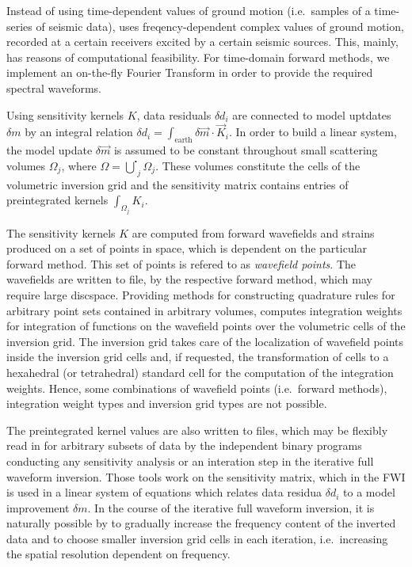 Instead of using time-dependent values of ground motion (i.e.\ samples of a time-series of seismic data), 
\ASKI{} uses freqency-dependent complex values of ground motion, recorded at a certain receivers excited 
by a certain seismic sources. This, mainly, has reasons of computational feasibility.
For time-domain forward methods, we implement an on-the-fly Fourier Transform in order to provide the
required spectral waveforms. 

Using sensitivity kernels $K$, data residuals $\delta d_i$ are connected to model uptdates $\delta m$ by 
an integral relation $\delta d_i = \int_{\text{earth}} \delta \vec{m} \cdot \vec{K}_i$. In order to build a linear 
system, the model update $\delta \vec{m}$ is assumed to be constant throughout small scattering volumes 
$\Omega_j$, where $\Omega = \overset{\centerdot}{\bigcup}_j \Omega_j$. These volumes constitute the cells of the volumetric 
inversion grid and the sensitivity matrix contains entries of preintegrated kernels $\int_{\Omega_j} K_i$.

The sensitivity kernels $K$ are computed from forward wavefields and strains produced on a set of points in 
space, which
is dependent on the particular forward method. This set of points is refered to as \emph{wavefield points}. The 
wavefields are written to file, by the respective forward method, which may require large discspace. 
Providing methods for constructing quadrature rules for arbitrary point sets contained in 
arbitrary volumes, 
\ASKI{} computes integration weights for integration of functions on the wavefield points over the volumetric
cells of the inversion grid. The inversion grid takes care of the localization of wavefield points 
inside the inversion grid cells and, if requested, the transformation of cells to a hexahedral (or tetrahedral) 
standard 
cell for the computation of the integration weights. Hence, some combinations of wavefield points (i.e.\ 
forward methods), integration weight types and inversion grid types are not possible. 

The preintegrated kernel values are also written to files, which may be flexibly read in for arbitrary 
subsets of data
by the independent binary programs conducting any sensitivity analysis 
or an interation step in the iterative full waveform inversion.
Those tools work on the sensitivity matrix, which in the FWI is used in a linear system of equations which
relates data residua $\delta d_i$ to a model improvement $\delta m$. 
In the course of the iterative full waveform inversion, it is naturally possible by \ASKI{} to gradually increase
the frequency content of the inverted data and to choose smaller inversion grid cells in each iteration, i.e.\ increasing
the spatial resolution dependent on frequency.


